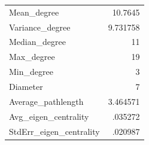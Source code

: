 \begin{tabular}{lr}
\toprule
\midrule
Mean_degree &     10.7645\\
Variance_degree&    9.731758\\
Median_degree&          11\\
Max_degree  &          19\\
Min_degree  &           3\\
Diameter    &           7\\
Average_pathlength&    3.464571\\
Avg_eigen_centrality&     .035272\\
StdErr_eigen_centrality&     .020987\\
\bottomrule
\end{tabular}
